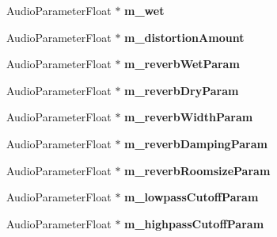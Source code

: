 \begin{DoxyCompactItemize}
\item 
Audio\+Parameter\+Float $\ast$ {\bfseries m\+\_\+wet}\hypertarget{class_synth_audio_processor_acb2862c12bf2bb82e5acd8dc798019f5}{}\label{class_synth_audio_processor_acb2862c12bf2bb82e5acd8dc798019f5}

\item 
Audio\+Parameter\+Float $\ast$ {\bfseries m\+\_\+distortion\+Amount}\hypertarget{class_synth_audio_processor_a3fd719e5f5593b9270724e80e3919866}{}\label{class_synth_audio_processor_a3fd719e5f5593b9270724e80e3919866}

\item 
Audio\+Parameter\+Float $\ast$ {\bfseries m\+\_\+reverb\+Wet\+Param}\hypertarget{class_synth_audio_processor_a64b7996fda36b2450a09e412940ce68d}{}\label{class_synth_audio_processor_a64b7996fda36b2450a09e412940ce68d}

\item 
Audio\+Parameter\+Float $\ast$ {\bfseries m\+\_\+reverb\+Dry\+Param}\hypertarget{class_synth_audio_processor_a958d4a51a4cd79264b5ed6dcb396103e}{}\label{class_synth_audio_processor_a958d4a51a4cd79264b5ed6dcb396103e}

\item 
Audio\+Parameter\+Float $\ast$ {\bfseries m\+\_\+reverb\+Width\+Param}\hypertarget{class_synth_audio_processor_aeb307760699cffad9cca53f89923d527}{}\label{class_synth_audio_processor_aeb307760699cffad9cca53f89923d527}

\item 
Audio\+Parameter\+Float $\ast$ {\bfseries m\+\_\+reverb\+Damping\+Param}\hypertarget{class_synth_audio_processor_a0603b3c2f729847635ea66861e76de72}{}\label{class_synth_audio_processor_a0603b3c2f729847635ea66861e76de72}

\item 
Audio\+Parameter\+Float $\ast$ {\bfseries m\+\_\+reverb\+Roomsize\+Param}\hypertarget{class_synth_audio_processor_ab2a411771aea7b7c093d74824cb0fa90}{}\label{class_synth_audio_processor_ab2a411771aea7b7c093d74824cb0fa90}

\item 
Audio\+Parameter\+Float $\ast$ {\bfseries m\+\_\+lowpass\+Cutoff\+Param}\hypertarget{class_synth_audio_processor_a0d6fb75f27b30fa8fdea74eefd43b655}{}\label{class_synth_audio_processor_a0d6fb75f27b30fa8fdea74eefd43b655}

\item 
Audio\+Parameter\+Float $\ast$ {\bfseries m\+\_\+highpass\+Cutoff\+Param}\hypertarget{class_synth_audio_processor_a2f750b08546c04e4cdf35133b0811916}{}\label{class_synth_audio_processor_a2f750b08546c04e4cdf35133b0811916}


\end{DoxyCompactItemize}
